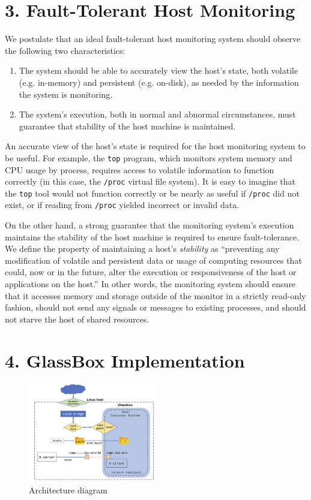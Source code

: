 \documentclass{proc}
\begin{document}
\section*{3. Fault-Tolerant Host Monitoring}

We postulate that an ideal fault-tolerant host monitoring system should observe the following two characteristics:
\begin{enumerate}
    \item The system should be able to accurately view the host's state, both volatile (e.g. in-memory) and persistent (e.g. on-disk), as needed by the information the system is monitoring.
    \item The system's execution, both in normal and abnormal circumstances, must guarantee that stability of the host machine is maintained.
\end{enumerate}

An accurate view of the host's state is required for the host monitoring system to be useful. For example, the \texttt{top} program, which monitors system memory and CPU usage by process, requires access to volatile information to function correctly (in this case, the \texttt{/proc} virtual file system). It is easy to imagine that the \texttt{top} tool would not function correctly or be nearly as useful if \texttt{/proc} did not exist, or if reading from \texttt{/proc} yielded incorrect or invalid data.

On the other hand, a strong guarantee that the monitoring system's execution maintains the stability of the host machine is required to ensure fault-tolerance. We define the property of maintaining a host's \textit{stability} as ``preventing any modification of volatile and persistent data or usage of computing resources that could, now or in the future, alter the execution or responsiveness of the host or applications on the host.'' In other words, the monitoring system should ensure that it accesses memory and storage outside of the monitor in a strictly read-only fashion, should not send any signals or messages to existing processes, and should not starve the host of shared resources.


\section*{4. GlassBox Implementation}
\begin{figure}
\includegraphics[width=0.5\textwidth]{architecture}
\caption{Architecture diagram}
\end{figure}
\end{document}
